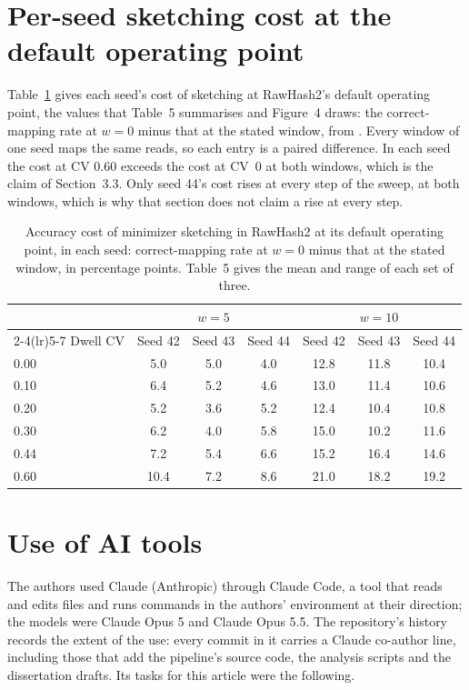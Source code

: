 \documentclass[11pt,a4paper]{article}
\begin{document}
\section{Per-seed sketching cost at the default operating point}\label{sec:s-perseed}

Table~\ref{tab:s-perseed} gives each seed's cost of sketching at RawHash2's default operating
point, the values that Table~5 summarises and Figure~4 draws: the correct-mapping rate at $w = 0$
minus that at the stated window, from . Every window of one
seed maps the same reads, so each entry is a paired difference. In each seed the cost at CV 0.60
exceeds the cost at CV~0 at both windows, which is the claim of Section~3.3. Only seed 44's cost
rises at every step of the sweep, at both windows, which is why that section does not claim a rise
at every step.

\begin{table}[htbp]
\centering
\caption{Accuracy cost of minimizer sketching in RawHash2 at its default operating point, in each
seed: correct-mapping rate at $w = 0$ minus that at the stated window, in percentage points.
Table~5 gives the mean and range of each set of three.}
\label{tab:s-perseed}
\begin{tabular}{lcccccc}
\toprule
& \multicolumn{3}{c}{$w = 5$} & \multicolumn{3}{c}{$w = 10$} \\
\cmidrule(lr){2-4}\cmidrule(lr){5-7}
Dwell CV & Seed 42 & Seed 43 & Seed 44 & Seed 42 & Seed 43 & Seed 44 \\
\midrule
0.00 & 5.0 & 5.0 & 4.0 & 12.8 & 11.8 & 10.4 \\
0.10 & 6.4 & 5.2 & 4.6 & 13.0 & 11.4 & 10.6 \\
0.20 & 5.2 & 3.6 & 5.2 & 12.4 & 10.4 & 10.8 \\
0.30 & 6.2 & 4.0 & 5.8 & 15.0 & 10.2 & 11.6 \\
0.44 & 7.2 & 5.4 & 6.6 & 15.2 & 16.4 & 14.6 \\
0.60 & 10.4 & 7.2 & 8.6 & 21.0 & 18.2 & 19.2 \\
\bottomrule
\end{tabular}
\end{table}

\section{Use of AI tools}\label{sec:s-ai}

The authors used Claude (Anthropic) through Claude Code, a tool that reads and edits files and runs
commands in the authors' environment at their direction; the models were Claude Opus 5 and Claude
Opus 5.5. The repository's history records the extent of the use: every commit in it carries a
Claude co-author line, including those that add the pipeline's source code, the analysis scripts and
the dissertation drafts. Its tasks for this article were the following.
\end{document}
